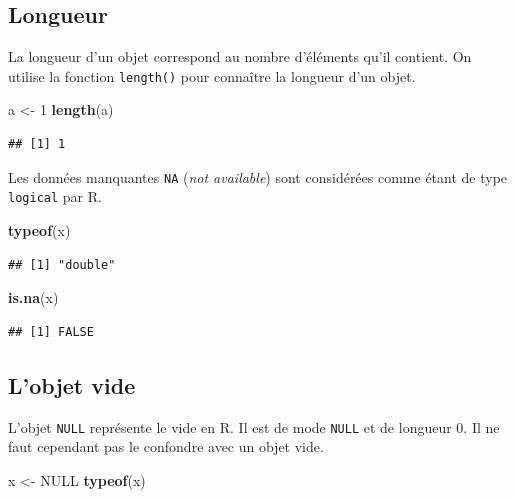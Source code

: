 \documentclass[
  11pt,
]{book}
\newenvironment{Shaded}{\begin{snugshade}}{\end{snugshade}}
\newcommand{\DecValTok}[1]{\textcolor[rgb]{0.00,0.00,0.81}{#1}}
\newcommand{\KeywordTok}[1]{\textcolor[rgb]{0.13,0.29,0.53}{\textbf{#1}}}
\newcommand{\NormalTok}[1]{#1}
\newcommand{\OtherTok}[1]{\textcolor[rgb]{0.56,0.35,0.01}{#1}}
\newcommand{\StringTok}[1]{\textcolor[rgb]{0.31,0.60,0.02}{#1}}
\numberwithin{equation}{section}
\numberwithin{countremarque}{section}
\begin{document}
\hypertarget{longueur}{%
\subsection{Longueur}\label{longueur}}

La longueur d'un objet correspond au nombre d'éléments qu'il contient. On utilise la fonction \texttt{length()} pour connaître la longueur d'un objet.

\begin{Shaded}
\begin{Highlighting}[]
\NormalTok{a \textless{}{-}}\StringTok{ }\DecValTok{1}
\KeywordTok{length}\NormalTok{(a)}
\end{Highlighting}
\end{Shaded}

\begin{lstlisting}
## [1] 1
\end{lstlisting}

Les données manquantes \texttt{NA} (\emph{not available}) sont considérées comme étant de type \texttt{logical} par R.

\begin{Shaded}
\begin{Highlighting}[]
\KeywordTok{typeof}\NormalTok{(x)}
\end{Highlighting}
\end{Shaded}

\begin{lstlisting}
## [1] "double"
\end{lstlisting}

\begin{Shaded}
\begin{Highlighting}[]
\KeywordTok{is.na}\NormalTok{(x)}
\end{Highlighting}
\end{Shaded}

\begin{lstlisting}
## [1] FALSE
\end{lstlisting}

\hypertarget{lobjet-vide}{%
\subsection{L'objet vide}\label{lobjet-vide}}

L'objet \texttt{NULL} représente le vide en R. Il est de mode \texttt{NULL} et de longueur 0. Il ne faut cependant pas le confondre avec un objet vide.

\begin{Shaded}
\begin{Highlighting}[]
\NormalTok{x \textless{}{-}}\StringTok{ }\OtherTok{NULL}
\KeywordTok{typeof}\NormalTok{(x)}
\end{Highlighting}
\end{Shaded}
\end{document}
